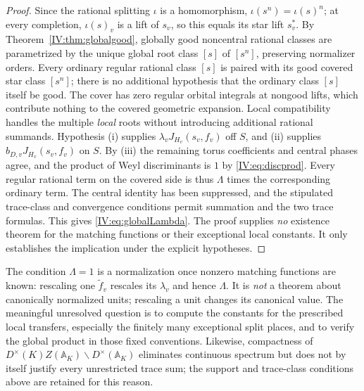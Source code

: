\begin{proof}
Since the rational splitting $\iota$ is a homomorphism,
$\iota(s^n)=\iota(s)^n$; at every completion, $\iota(s)_v$
is a lift of $s_v$, so this equals its star lift $s_v^*$.
By Theorem~\ref{IV:thm:globalgood}, globally good noncentral
rational classes are parametrized by the unique global root
class $[s]$ of $[s^n]$, preserving normalizer orders.
Every ordinary regular rational class $[s]$ is paired with its good
covered star class $[s^n]$; there is no additional hypothesis
that the ordinary class $[s]$ itself be good.  The cover has zero
regular orbital integrals at nongood lifts, which contribute
nothing to the covered geometric expansion.  Local compatibility
handles the multiple \emph{local} roots without introducing
additional rational summands.  Hypothesis (i) supplies
$\lambda_v J_{H_v}(s_v,f_v)$ off $S$, and (ii) supplies
$b_{D,v}J_{H_v}(s_v,f_v)$ on $S$. By (iii) the remaining torus
coefficients and central phases agree, and the product of Weyl
discriminants is $1$ by \eqref{IV:eq:discprod}.  Every regular
rational term on the covered side is thus $\Lambda$ times the
corresponding ordinary term.  The central identity has been
suppressed, and the stipulated trace-class and convergence
conditions permit summation and the two trace formulas. This
gives \eqref{IV:eq:globalLambda}.  The proof supplies \emph{no}
existence theorem for the matching functions or their exceptional
local constants.  It only establishes the implication under the
explicit hypotheses.
\end{proof}

\begin{remark}
The condition $\Lambda=1$ is a normalization once nonzero
matching functions are known: rescaling one $\widetilde f_v$
rescales its $\lambda_v$ and hence $\Lambda$. It is \emph{not}
a theorem about canonically normalized units; rescaling a unit
changes its canonical value.  The meaningful unresolved question
is to compute the constants for the prescribed local transfers,
especially the finitely many exceptional split places, and to
verify the global product in those fixed conventions.
Likewise, compactness of $D^\times(K)Z(\mathbb A_K)\backslash
D^\times(\mathbb A_K)$ eliminates continuous spectrum but does
not by itself justify every unrestricted trace sum; the support
and trace-class conditions above are retained for this reason.
\end{remark}

